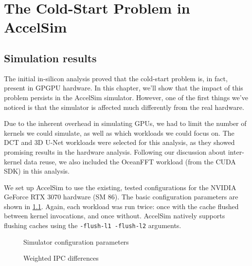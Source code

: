 \chapter{The Cold-Start Problem in AccelSim}\label{ch:sim-analysis}

\section{Simulation results}\label{sec:simulation-results}
The initial in-silicon analysis proved that the cold-start problem is, in fact, present in GPGPU hardware.
In this chapter, we'll show that the impact of this problem persists in the AccelSim simulator.
However, one of the first things we've noticed is that the simulator is affected much differently from the real hardware.

Due to the inherent overhead in simulating GPUs, we had to limit the number of kernels we could simulate, as well as which workloads we could focus on.
The DCT and 3D U-Net workloads were selected for this analysis, as they showed promising results in the hardware analysis.
Following our discussion about inter-kernel data reuse, we also included the OceanFFT workload (from the CUDA SDK) in this analysis.

We set up AccelSim to use the existing, tested configurations for the NVIDIA GeForce RTX 3070 hardware (SM 86).
The basic configuration parameters are shown in \cref{fig:sim_config}.
Again, each workload was run twice: once with the cache flushed between kernel invocations, and once without.
AccelSim natively supports flushing caches using the \verb|-flush-l1 -flush-l2| arguments.

\begin{figure}[ht]
    \centering
    
    \caption{Simulator configuration parameters}
    \label{fig:sim_config}
\end{figure}

\begin{figure}[ht]
    \centering
    \begin{minipage}[c]{0.45\textwidth}
        \resizebox{\textwidth}{!}{}
    \end{minipage}
    \begin{minipage}[c]{0.45\textwidth}
        \resizebox{\textwidth}{!}{}
    \end{minipage}
    \caption{Weighted IPC differences}
    \label{fig:sim_ipc_diff}
\end{figure}

